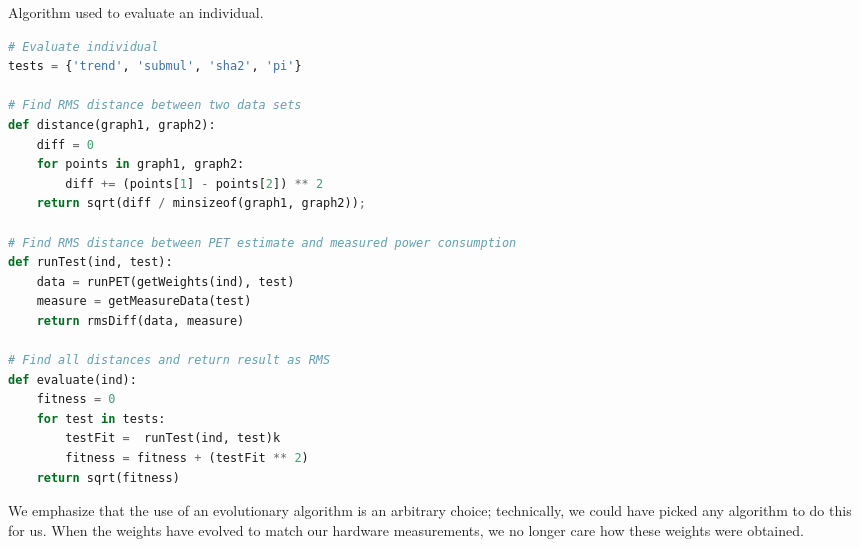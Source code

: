 \begin{algorithm}
\caption{Algorithm used to evaluate an individual.}
\label{lst:ga-eval-algorithm}
\begin{lstlisting}[language=python,style=algo]
# Evaluate individual
tests = {'trend', 'submul', 'sha2', 'pi'}

# Find RMS distance between two data sets
def distance(graph1, graph2):
    diff = 0
    for points in graph1, graph2:
        diff += (points[1] - points[2]) ** 2
    return sqrt(diff / minsizeof(graph1, graph2));

# Find RMS distance between PET estimate and measured power consumption
def runTest(ind, test):
    data = runPET(getWeights(ind), test)
    measure = getMeasureData(test)
    return rmsDiff(data, measure)

# Find all distances and return result as RMS
def evaluate(ind):
    fitness = 0
    for test in tests:
        testFit =  runTest(ind, test)k
        fitness = fitness + (testFit ** 2)
    return sqrt(fitness)
\end{lstlisting}
\end{algorithm}




We emphasize that the use of an evolutionary algorithm is an arbitrary choice;
technically, we could have picked any algorithm to do this for us. When the
weights have evolved to match our hardware measurements, we no longer care how
these weights were obtained.
